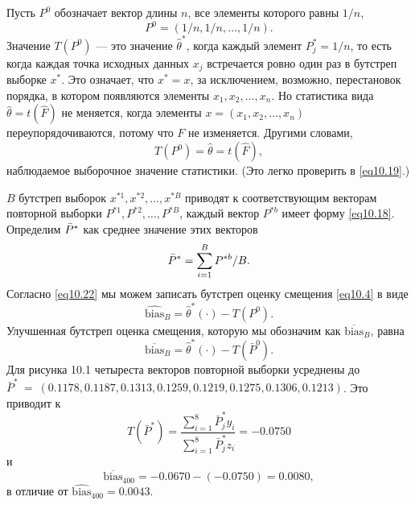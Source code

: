 Пусть $P^{0}$ обозначает вектор длины $n$, все элементы которого равны $1/n$,
\begin{equation}\label{eq10.21}
   P^{0} = (1/n, 1/n, \dots, 1/n).
\end{equation}
Значение $T(P^{0})$ --- это значение $\hat{\theta}^{*}$, когда каждый элемент $P_{j}^{*} = 1/n$, то есть когда каждая точка исходных данных $x_j$ встречается ровно один раз в бутстреп выборке $x^{*}$. Это означает, что $x^{*} = x$, за исключением, возможно, перестановок порядка, в котором появляются элементы $x_{1}, x_{2}, \dots, x_{n}$. Но статистика вида $\hat{\theta} = t(\hat{F})$ не меняется, когда элементы $x = (x_1, x_2, \dots, x_n)$ переупорядочиваются, потому что $F$ не изменяется. Другими словами,
\begin{equation}\label{eq10.22}
   T(P^{0}) = \hat{\theta} = t(\hat{F}),
\end{equation}
наблюдаемое выборочное значение статистики. (Это легко проверить в \ref{eq10.19}.)

$B$ бутстреп выборок $x^{*1}, x^{*2}, \dots, x^{*B}$ приводят к соответствующим векторам повторной выборки $P^{*1}, P^{*2}, \dots, P^{*B}$, каждый вектор $P^{*b}$ имеет форму \ref{eq10.18}. Определим $\Bar{P}^{*}$ как среднее значение этих векторов
\begin{equation}\label{eq10.23}
   \Bar{P}^{*} = \sum\limits_{i=1}^{B}P^{*b}/B.
\end{equation}
Согласно \ref{eq10.22} мы можем записать бутстреп оценку смещения \ref{eq10.4} в виде
\begin{equation}\label{eq10.24}
   \widehat{\text{bias}}_{B} = \hat{\theta}^{*}(\cdot) - T(P^{0}).
\end{equation}
Улучшенная бутстреп оценка смещения, которую мы обозначим как $\overline{\text{bias}}_{B}$, равна
\begin{equation}\label{eq10.25}
   \overline{\text{bias}}_{B} = \hat{\theta}^{*}(\cdot) - T(\bar{P}^{0}).
\end{equation}
Для рисунка 10.1 четыреста векторов повторной выборки усреднены до  $\bar{P}^{*}~=~(0.1178, 0.1187, 0.1313, 0.1259, 0.1219, 0.1275, 0.1306, 0.1213)$. Это приводит к
\begin{equation}\label{eq10.26}
  T(\bar{P}^{*}) = \frac{\sum_{i=1}^{8}\bar{P}^{*}_{j}y_{i}}{\sum_{i=1}^{8}\bar{P}^{*}_{j}z_{i}} = -0.0750
\end{equation}
и
\begin{equation}\label{eq10.27}
  \overline{\text{bias}}_{400} = -0.0670 - (-0.0750) = 0.0080,
\end{equation}
в отличие от $\widehat{\text{bias}}_{400} = 0.0043$.

